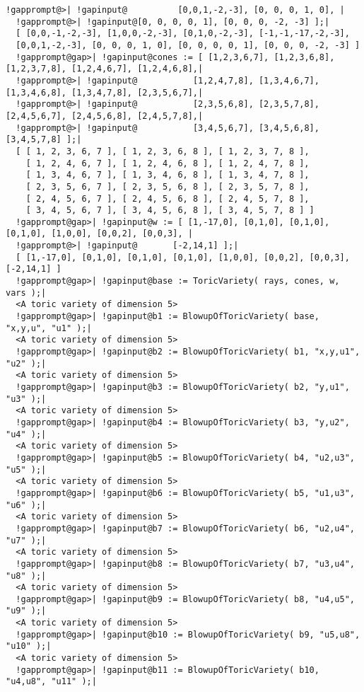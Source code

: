\documentclass[a4paper,11pt]{report}
\begin{document}
{{{\begin{Verbatim}[commandchars=!@|,fontsize=\small,frame=single,label=Example]
  !gapprompt@>| !gapinput@          [0,0,1,-2,-3], [0, 0, 0, 1, 0], |
  !gapprompt@>| !gapinput@[0, 0, 0, 0, 1], [0, 0, 0, -2, -3] ];|
  [ [0,0,-1,-2,-3], [1,0,0,-2,-3], [0,1,0,-2,-3], [-1,-1,-17,-2,-3], 
  [0,0,1,-2,-3], [0, 0, 0, 1, 0], [0, 0, 0, 0, 1], [0, 0, 0, -2, -3] ]
  !gapprompt@gap>| !gapinput@cones := [ [1,2,3,6,7], [1,2,3,6,8], [1,2,3,7,8], [1,2,4,6,7], [1,2,4,6,8],|
  !gapprompt@>| !gapinput@           [1,2,4,7,8], [1,3,4,6,7], [1,3,4,6,8], [1,3,4,7,8], [2,3,5,6,7],|
  !gapprompt@>| !gapinput@           [2,3,5,6,8], [2,3,5,7,8], [2,4,5,6,7], [2,4,5,6,8], [2,4,5,7,8],|
  !gapprompt@>| !gapinput@           [3,4,5,6,7], [3,4,5,6,8], [3,4,5,7,8] ];|
  [ [ 1, 2, 3, 6, 7 ], [ 1, 2, 3, 6, 8 ], [ 1, 2, 3, 7, 8 ],
    [ 1, 2, 4, 6, 7 ], [ 1, 2, 4, 6, 8 ], [ 1, 2, 4, 7, 8 ],
    [ 1, 3, 4, 6, 7 ], [ 1, 3, 4, 6, 8 ], [ 1, 3, 4, 7, 8 ],
    [ 2, 3, 5, 6, 7 ], [ 2, 3, 5, 6, 8 ], [ 2, 3, 5, 7, 8 ],
    [ 2, 4, 5, 6, 7 ], [ 2, 4, 5, 6, 8 ], [ 2, 4, 5, 7, 8 ],
    [ 3, 4, 5, 6, 7 ], [ 3, 4, 5, 6, 8 ], [ 3, 4, 5, 7, 8 ] ]
  !gapprompt@gap>| !gapinput@w := [ [1,-17,0], [0,1,0], [0,1,0], [0,1,0], [1,0,0], [0,0,2], [0,0,3], |
  !gapprompt@>| !gapinput@       [-2,14,1] ];|
  [ [1,-17,0], [0,1,0], [0,1,0], [0,1,0], [1,0,0], [0,0,2], [0,0,3], [-2,14,1] ]
  !gapprompt@gap>| !gapinput@base := ToricVariety( rays, cones, w, vars );|
  <A toric variety of dimension 5>
  !gapprompt@gap>| !gapinput@b1 := BlowupOfToricVariety( base, "x,y,u", "u1" );|
  <A toric variety of dimension 5>
  !gapprompt@gap>| !gapinput@b2 := BlowupOfToricVariety( b1, "x,y,u1", "u2" );|
  <A toric variety of dimension 5>
  !gapprompt@gap>| !gapinput@b3 := BlowupOfToricVariety( b2, "y,u1", "u3" );|
  <A toric variety of dimension 5>
  !gapprompt@gap>| !gapinput@b4 := BlowupOfToricVariety( b3, "y,u2", "u4" );|
  <A toric variety of dimension 5>
  !gapprompt@gap>| !gapinput@b5 := BlowupOfToricVariety( b4, "u2,u3", "u5" );|
  <A toric variety of dimension 5>
  !gapprompt@gap>| !gapinput@b6 := BlowupOfToricVariety( b5, "u1,u3", "u6" );|
  <A toric variety of dimension 5>
  !gapprompt@gap>| !gapinput@b7 := BlowupOfToricVariety( b6, "u2,u4", "u7" );|
  <A toric variety of dimension 5>
  !gapprompt@gap>| !gapinput@b8 := BlowupOfToricVariety( b7, "u3,u4", "u8" );|
  <A toric variety of dimension 5>
  !gapprompt@gap>| !gapinput@b9 := BlowupOfToricVariety( b8, "u4,u5", "u9" );|
  <A toric variety of dimension 5>
  !gapprompt@gap>| !gapinput@b10 := BlowupOfToricVariety( b9, "u5,u8", "u10" );|
  <A toric variety of dimension 5>
  !gapprompt@gap>| !gapinput@b11 := BlowupOfToricVariety( b10, "u4,u8", "u11" );|

\end{Verbatim}}}}
\end{document}
